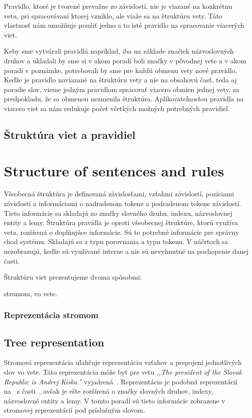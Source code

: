 Pravidlo, ktoré je tvorené prevažne zo závislostí, nie je viazané na konkrétnu vetu, pri spracovávaní ktorej vzniklo, ale viaže sa na štruktúru vety. Táto vlastnosť nám umožňuje použiť jedno a to isté pravidlo na spracovanie viacerých viet.

Keby sme vytvárali pravidlá napríklad, iba na základe značiek názvoslovných druhov a ukladali by sme si v akom poradí boli značky v pôvodnej vete a v akom poradí v poznámke, potrebovali by sme pre každú obmenu vety nové pravidlo. Keďže je pravidlo naviazané na štruktúru vety a nie na obsahovú časť, teda aj poradie slov, vieme jedným pravidlom spracovať viacero obmien jednej vety, za predpokladu, že sa obmenou nezmenila štruktúra. Aplikovateľnosťou pravidla na viacero viet sa nám redukuje počet všetkých možných potrebných pravidiel.

%
%
{
	\subsection{Štruktúra viet a pravidiel}
}
{
	\section{Structure of sentences and rules}
}
\label{subsection:structure_of_sentences_and_rules}
Všeobecná štruktúra je definovaná závislosťami, vzťahmi závislostí, pozíciami závislostí a informáciami o nadradenom tokene a podradenom tokene závislostí. Tieto informácie sa skladajú zo značky slovného druhu, indexu, názvoslovnej entity a lemy. Štruktúra pravidla je oproti všeobecnej štruktúre, ktorú využíva veta, rozšírená o doplňujúce informácie. Sú to potrebné informácie pre správny chod systému. Skladajú sa z typu porovnania a typu tokenu. V náčrtoch sa nezobrazujú, keďže sú využívané interne a nie sú nevyhnutné na pochopenie danej časti.

Štruktúru viet prezentujeme dvoma spôsobmi:
\begin{my_itemize}
	\myitem stromom,
	\myitem vo vete.
\end{my_itemize}

%
%
{
	\subsubsection{Reprezentácia stromom}
}
{
	\subsection{Tree representation}
}
\label{subsubsection:structure_tree_representation}
Stromová reprezentácia uľahčuje reprezentáciu vzťahov a prepojení jednotlivých slov vo vete. Táto reprezentácia môže byť pre vetu \textit{,,The president of the Slovak Republic is Andrej Kiska.''} vyjadrená~. Reprezentácia je podobná reprezentácií na~ z časti~, avšak je ešte rozšírená o značky slovných druhov, indexy, názvoslovné entity a lemy. V tomto poradí sú tieto informácie zobrazene v stromovej reprezentácií pod príslušným slovom.

